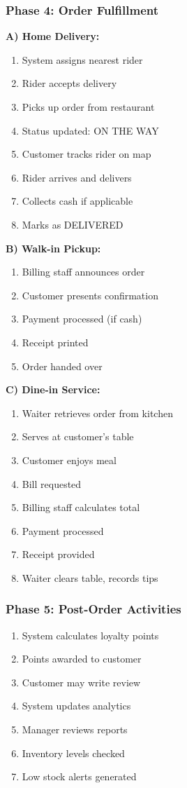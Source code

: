 \documentclass[12pt,a4paper]{article}
\begin{document}
\subsubsection{Phase 4: Order Fulfillment}

\textbf{A) Home Delivery:}
\begin{enumerate}
    \item System assigns nearest rider
    \item Rider accepts delivery
    \item Picks up order from restaurant
    \item Status updated: ON THE WAY
    \item Customer tracks rider on map
    \item Rider arrives and delivers
    \item Collects cash if applicable
    \item Marks as DELIVERED
\end{enumerate}

\textbf{B) Walk-in Pickup:}
\begin{enumerate}
    \item Billing staff announces order
    \item Customer presents confirmation
    \item Payment processed (if cash)
    \item Receipt printed
    \item Order handed over
\end{enumerate}

\textbf{C) Dine-in Service:}
\begin{enumerate}
    \item Waiter retrieves order from kitchen
    \item Serves at customer's table
    \item Customer enjoys meal
    \item Bill requested
    \item Billing staff calculates total
    \item Payment processed
    \item Receipt provided
    \item Waiter clears table, records tips
\end{enumerate}

\subsubsection{Phase 5: Post-Order Activities}
\begin{enumerate}
    \item System calculates loyalty points
    \item Points awarded to customer
    \item Customer may write review
    \item System updates analytics
    \item Manager reviews reports
    \item Inventory levels checked
    \item Low stock alerts generated
\end{enumerate}
\end{document}
